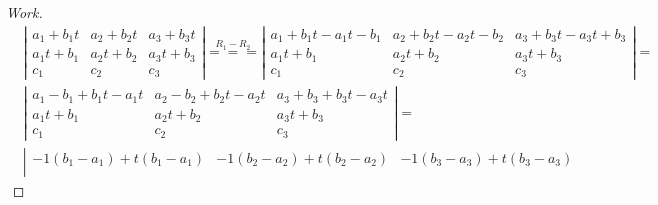 \documentclass{article}
\begin{document}
\begin{proof}[Work]
  \begin{align*}
     & \left\lvert \begin{array}{ccc}
                     a_1 + b_1t & a_2 + b_2t & a_3 + b_3t \\
                     a_1t + b_1 & a_2t + b_2 & a_3t + b_3 \\
                     c_1        & c_2        & c_3
                   \end{array} \right\rvert \overset{R_1 - R_2}{===}
    \left\lvert \begin{array}{ccc}
                  a_1 + b_1t - a_1t - b_1 & a_2 + b_2t - a_2t - b_2 & a_3 + b_3t - a_3t + b_3 \\
                  a_1t + b_1              & a_2t + b_2              & a_3t + b_3              \\
                  c_1                     & c_2                     & c_3
                \end{array} \right\rvert =                   \\
     & \left\lvert \begin{array}{ccc}
                     a_1 - b_1 + b_1t - a_1t & a_2 - b_2 + b_2t - a_2t & a_3 + b_3 + b_3t - a_3t \\
                     a_1t + b_1              & a_2t + b_2              & a_3t + b_3              \\
                     c_1                     & c_2                     & c_3
                   \end{array} \right\rvert =                \\
     & \left\lvert \begin{array}{ccc}
                     -1(b_1 - a_1) + t(b_1 - a_1) & -1(b_2 - a_2) + t(b_2 - a_2) & -1(b_3 - a_3) + t(b_3 - a_3) \\

\end{array}
\end{align*}
\end{proof}
\end{document}
